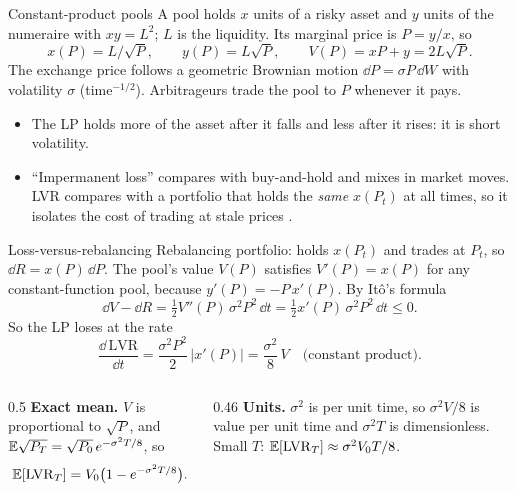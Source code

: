 \documentclass[aspectratio=169,10pt]{beamer}
\begin{document}
\begin{frame}{Constant-product pools}
  \small
  A pool holds $x$ units of a risky asset and $y$ units of the numeraire with $xy = L^2$; $L$ is the liquidity. Its marginal price is $P = y/x$, so
  \[ x(P) = L/\sqrt P, \qquad y(P) = L\sqrt P, \qquad V(P) = xP + y = 2L\sqrt P . \]
  The exchange price follows a geometric Brownian motion $\dd P = \sigma P\,\dd W$ with volatility $\sigma$ (time$^{-1/2}$). Arbitrageurs trade the pool to $P$ whenever it pays.
  \vspace{0.3em}
  \begin{itemize}
    \item The LP holds more of the asset after it falls and less after it rises: it is short volatility.
    \item ``Impermanent loss'' compares with buy-and-hold and mixes in market moves. LVR compares with a portfolio that holds the \emph{same} $x(P_t)$ at all times, so it isolates the cost of trading at stale prices \citep{milionis2022automated}.
  \end{itemize}
\end{frame}

\begin{frame}{Loss-versus-rebalancing}
  \small
  Rebalancing portfolio: holds $x(P_t)$ and trades at $P_t$, so $\dd R = x(P)\,\dd P$. The pool's value $V(P)$ satisfies $V'(P) = x(P)$ for any constant-function pool, because $y'(P) = -P\,x'(P)$. By Itô's formula
  \[ \dd V - \dd R = \tfrac12 V''(P)\,\sigma^2P^2\,\dd t = \tfrac12 x'(P)\,\sigma^2P^2\,\dd t \le 0 . \]
  So the LP loses at the rate
  \[ \frac{\dd\,\mathrm{LVR}}{\dd t} = \frac{\sigma^2P^2}{2}\,|x'(P)| = \frac{\sigma^2}{8}\,V \quad\text{(constant product).} \]
  \begin{columns}[T]
    \begin{column}{0.5\textwidth}
      \textbf{Exact mean.} $V$ is proportional to $\sqrt P$, and $\mathbb{E}\sqrt{P_T} = \sqrt{P_0}\,e^{-\sigma^2T/8}$, so
      \[ \mathbb{E}[\mathrm{LVR}_T] = V_0\big(1 - e^{-\sigma^2T/8}\big). \]
    \end{column}
    \begin{column}{0.46\textwidth}
      \textbf{Units.} $\sigma^2$ is per unit time, so $\sigma^2V/8$ is value per unit time and $\sigma^2T$ is dimensionless. Small $T$: $\mathbb{E}[\mathrm{LVR}_T] \approx \sigma^2V_0T/8$.
    \end{column}
  \end{columns}
\end{frame}
\end{document}
